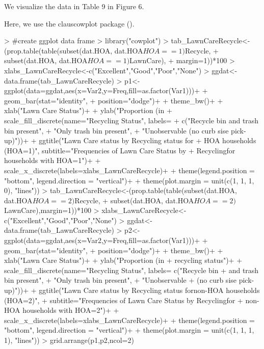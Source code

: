 \documentclass{article}
\begin{document}
We visualize the data in Table 9 in Figure 6. 

Here, we use the clauscowplot package (\cite{clauscowplot}).

\begin{Schunk}
\begin{Sinput}
> #create ggplot data frame
> library("cowplot")
> tab_LawnCareRecycle<-(prop.table(table(subset(dat.HOA, dat.HOA$HOA==1)$Recycle,
+                                        subset(dat.HOA, dat.HOA$HOA==1)$LawnCare),
+                                  margin=1))*100
> xlabs_LawnCareRecycle<-c("Excellent","Good","Poor","None")
> ggdat<-data.frame(tab_LawnCareRecycle)
> p1<-ggplot(data=ggdat,aes(x=Var2,y=Freq,fill=as.factor(Var1)))+
+   geom_bar(stat="identity",
+            position="dodge")+
+   theme_bw()+
+   xlab("Lawn Care Status")+
+   ylab("Proportion (in %
+   scale_fill_discrete(name="Recycling Status", labels= 
+                         c("Recycle bin and trash bin present",
+                           "Only trash bin present", 
+                           "Unobservable (no curb sise pick-up)"))+
+   ggtitle("Lawn Care status by Recycling status for\nonly 
+           HOA households (HOA=1)", subtitle="Frequencies of Lawn Care Status by 
+           Recycling\nstatus for households with HOA=1")+
+   scale_x_discrete(labels=xlabs_LawnCareRecycle)+
+   theme(legend.position = "bottom", legend.direction = "vertical")+
+   theme(plot.margin = unit(c(1, 1, 1, 0), "lines"))
> tab_LawnCareRecycle<-(prop.table(table(subset(dat.HOA, dat.HOA$HOA==2)$Recycle,
+                                        subset(dat.HOA, dat.HOA$HOA==2)$LawnCare),margin=1))*100
> xlabs_LawnCareRecycle<-c("Excellent","Good","Poor","None")
> ggdat<-data.frame(tab_LawnCareRecycle)
> p2<-ggplot(data=ggdat,aes(x=Var2,y=Freq,fill=as.factor(Var1)))+
+   geom_bar(stat="identity",
+            position="dodge")+
+   theme_bw()+
+   xlab("Lawn Care Status")+
+   ylab("Proportion (in %
+        recycling status")+
+   scale_fill_discrete(name="Recycling Status", labels= c("Recycle bin 
+                                                          and trash bin present",
+                                                          "Only trash bin present", 
+                                                          "Unobservable 
+                                                          (no curb sise pick-up)"))+
+   ggtitle("Lawn Care status by Recycling status for\nonly non-HOA households (HOA=2)",
+           subtitle="Frequencies of Lawn Care Status by Recycling\nstatus for 
+           non-HOA households with HOA=2")+
+   scale_x_discrete(labels=xlabs_LawnCareRecycle)+
+   theme(legend.position = "bottom", legend.direction = "vertical")+
+   theme(plot.margin = unit(c(1, 1, 1, 1), "lines"))
> grid.arrange(p1,p2,ncol=2)
\end{Sinput}
\end{Schunk}
\end{document}
